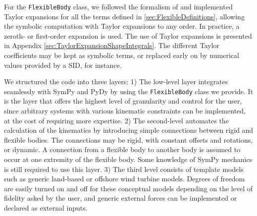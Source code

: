 \documentclass[wes, manuscript]{copernicus}
\begin{document}
For the \texttt{FlexibleBody} class, we followed the formalism of \cite{Wallrapp:1994} and implemented Taylor expansions for all the terms defined in \autoref{sec:FlexibleDefinitions}, allowing the symbolic computation with Taylor expansions to any order.
In practice, a zeroth- or first-order expansion is used.
The use of Taylor expansions is presented in Appendix \ref{sec:TaylorExpansionShapeIntegrals}. 
The different Taylor coefficients may be kept as symbolic terms, or replaced early on by numerical values provided by a SID, for instance. 



We structured the code into three layers:
1) The low-level layer integrates seamlessly with SymPy and PyDy by using the \texttt{FlexibleBody} class we provide.
It is the layer that offers the highest level of granularity and control for the user, since arbitrary systems with various kinematic constraints can be implemented, at the cost of requiring more expertise.
2) The second-level automates the calculation of the kinematics by introducing simple connections between rigid and flexible bodies.
The connections may be rigid, with constant offsets and rotations, or dynamic.
A connection from a flexible body to another body is assumed to occur at one extremity of the flexible body.
Some knowledge of SymPy mechanics is still required to use this layer.
3) The third level consists of template models such as generic land-based or offshore wind turbine models.
Degrees of freedom are easily turned on and off for these conceptual models depending on the level of fidelity asked by the user, and generic external forces can be implemented or declared as external inputs.
\end{document}
